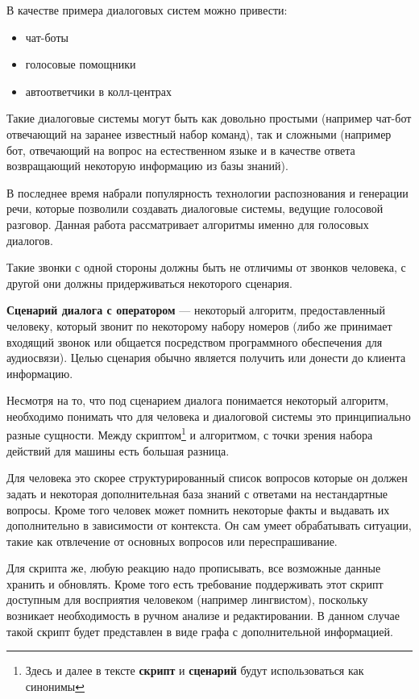 \documentclass[specification,annotation]{itmo-student-thesis}
\begin{document}
	В качестве примера диалоговых систем можно привести: 
	\begin{itemize}
		\item чат-боты
		\item голосовые помощники
		\item автоответчики в колл-центрах
	\end{itemize}

	Такие диалоговые системы могут быть как довольно простыми (например чат-бот отвечающий на заранее известный набор команд), так и сложными (например бот, отвечающий на вопрос на естественном языке и в качестве ответа возвращающий некоторую информацию из базы знаний).
	
	В последнее время набрали популярность технологии распознования и генерации речи, которые позволили создавать диалоговые системы, ведущие голосовой разговор. Данная работа рассматривает алгоритмы именно для голосовых диалогов.
	
	Такие звонки с одной стороны должны быть не отличимы от звонков человека, с другой они должны придерживаться некоторого сценария.
	
	\textbf{Сценарий диалога с оператором} — некоторый алгоритм, предоставленный человеку, который звонит по некоторому набору номеров (либо же принимает входящий звонок или общается посредством программного обеспечения для аудиосвязи). Целью сценария обычно является получить или донести до клиента информацию. 
	
	Несмотря на то, что под сценарием диалога понимается некоторый алгоритм, необходимо понимать что для человека и диалоговой системы это принципиально разные сущности. Между скриптом\footnote{Здесь и далее в тексте \textbf{скрипт} и \textbf{сценарий} будут использоваться как синонимы} и алгоритмом, с точки зрения набора действий для машины есть большая разница. 
	
	Для человека это скорее структурированный список вопросов которые он должен задать и некоторая дополнительная база знаний с ответами на нестандартные вопросы. Кроме того человек может помнить некоторые факты и выдавать их дополнительно в зависимости от контекста. Он сам умеет обрабатывать ситуации, такие как отвлечение от основных вопросов или переспрашивание.
	
	Для скрипта же, любую реакцию надо прописывать, все возможные данные хранить и обновлять. Кроме того есть требование поддерживать этот скрипт доступным для восприятия человеком (например лингвистом), поскольку возникает необходимость в ручном анализе и редактировании. В данном случае такой скрипт будет представлен в виде графа с дополнительной информацией.
	
\end{document}
